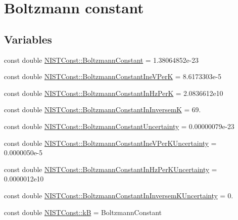 \hypertarget{group___n_i_s_t_const-_boltzmann_constant}{}\section{Boltzmann constant}
\label{group___n_i_s_t_const-_boltzmann_constant}
\subsection*{Variables}
\begin{DoxyCompactItemize}
\item 
const double \hyperlink{group___n_i_s_t_const-_boltzmann_constant_ga505057a2eb7e925fde668cc1025331df}{N\+I\+S\+T\+Const\+::\+Boltzmann\+Constant} = 1.\+38064852e-\/23
\item 
const double \hyperlink{group___n_i_s_t_const-_boltzmann_constant_gad31ba56bbe6d4a0f40252ef7b48b52a3}{N\+I\+S\+T\+Const\+::\+Boltzmann\+Constant\+Ine\+V\+PerK} = 8.\+6173303e-\/5
\item 
const double \hyperlink{group___n_i_s_t_const-_boltzmann_constant_ga5c59003e6fbd70482ee1bdaf7ea35b7a}{N\+I\+S\+T\+Const\+::\+Boltzmann\+Constant\+In\+Hz\+PerK} = 2.\+0836612e10
\item 
const double \hyperlink{group___n_i_s_t_const-_boltzmann_constant_ga4f4d8adf824657420f54680daa6340d5}{N\+I\+S\+T\+Const\+::\+Boltzmann\+Constant\+In\+InversemK} = 69.
\item 
const double \hyperlink{group___n_i_s_t_const-_boltzmann_constant_gaa32ac947c545e70076f0e08aceb3ce16}{N\+I\+S\+T\+Const\+::\+Boltzmann\+Constant\+Uncertainty} = 0.\+00000079e-\/23
\item 
const double \hyperlink{group___n_i_s_t_const-_boltzmann_constant_ga6a1c42c4e69994962116d279d6f49203}{N\+I\+S\+T\+Const\+::\+Boltzmann\+Constant\+Ine\+V\+Per\+K\+Uncertainty} = 0.\+0000050e-\/5
\item 
const double \hyperlink{group___n_i_s_t_const-_boltzmann_constant_gaa87e06f419f94e4ea1ac8dcd769537ee}{N\+I\+S\+T\+Const\+::\+Boltzmann\+Constant\+In\+Hz\+Per\+K\+Uncertainty} = 0.\+0000012e10
\item 
const double \hyperlink{group___n_i_s_t_const-_boltzmann_constant_gadb520d4ce5d980c8ba24d9499f500873}{N\+I\+S\+T\+Const\+::\+Boltzmann\+Constant\+In\+Inversem\+K\+Uncertainty} = 0.
\item 
const double \hyperlink{group___n_i_s_t_const-_boltzmann_constant_ga6c7ead5913113ec6e980e80f21d27fd0}{N\+I\+S\+T\+Const\+::kB} = Boltzmann\+Constant

\end{DoxyCompactItemize}
